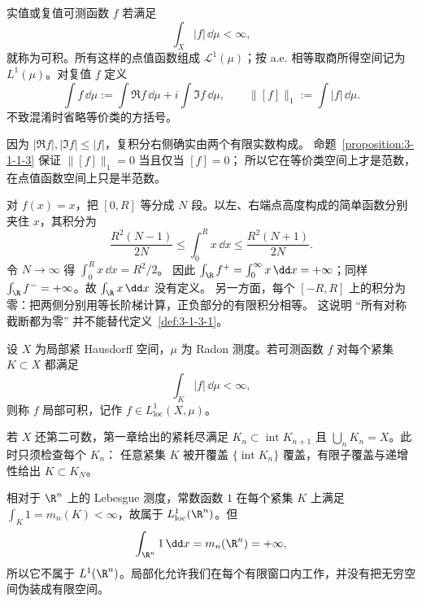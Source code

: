 \begin{definition}[$L^1$ 可积]\label{def:3-1-3-2}
实值或复值可测函数 $f$ 若满足
\[
 \int_X|f|\,\dd\mu<\infty,
\]
就称为可积。所有这样的点值函数组成 $\mathcal L^1(\mu)$；按 a.e. 相等取商所得空间记为
$L^1(\mu)$。对复值 $f$ 定义
\[
 \int f\,\dd\mu:=\int\Re f\,\dd\mu+i\int\Im f\,\dd\mu,
 \qquad
 \|[f]\|_1:=\int|f|\,\dd\mu.
 \tag{3.1.16}\label{eq:3-1-complex-integral}
\]
不致混淆时省略等价类的方括号。
\end{definition}

因为 $|\Re f|,|\Im f|\leq|f|$，复积分右侧确实由两个有限实数构成。
命题~\ref{proposition:3-1-1-3} 保证 $\|[f]\|_1=0$ 当且仅当 $[f]=0$；
所以它在等价类空间上才是范数，在点值函数空间上只是半范数。

\begin{example}[条件抵消不可定义]\label{ex:3-1-3-1}
对 $f(x)=x$，把 $[0,R]$ 等分成 $N$ 段。以左、右端点高度构成的简单函数分别夹住 $x$，其积分为
\[
 \frac{R^2(N-1)}{2N}
 \leq\int_0^R x\,\dd x
 \leq\frac{R^2(N+1)}{2N}.
\]
令 $N\to\infty$ 得 $\int_0^Rx\,\dd x=R^2/2$。
因此 $\int_\R f^+=\int_0^\infty x\,\dd x=+\infty$；同样
$\int_\R f^-=+\infty$。故 $\int_\R x\,\dd x$ 没有定义。
另一方面，每个 $[-R,R]$ 上的积分为零：把两侧分别用等长阶梯计算，正负部分的有限积分相等。
这说明 ``所有对称截断都为零'' 并不能替代定义~\ref{def:3-1-3-1}。
\end{example}

\begin{definition}[局部可积]\label{def:3-1-3-3}
设 $X$ 为局部紧 Hausdorff 空间，$\mu$ 为 Radon 测度。若可测函数 $f$ 对每个紧集
$K\subset X$ 都满足
\[
 \int_K|f|\,\dd\mu<\infty,
\]
则称 $f$ 局部可积，记作 $f\in L^1_{\mathrm{loc}}(X,\mu)$。
\end{definition}

若 $X$ 还第二可数，第一章给出的紧耗尽满足
$K_n\subset\operatorname{int}K_{n+1}$ 且 $\bigcup_nK_n=X$。此时只须检查每个 $K_n$：
任意紧集 $K$ 被开覆盖 $\{\operatorname{int}K_n\}$ 覆盖，有限子覆盖与递增性给出
$K\subset K_N$。

\begin{example}[局部可积但不可积]\label{ex:3-1-3-2}
相对于 $\R^n$ 上的 Lebesgue 测度，常数函数 $1$ 在每个紧集 $K$ 上满足
$\int_K1=m_n(K)<\infty$，故属于 $L^1_{\mathrm{loc}}(\R^n)$。但
\[
 \int_{\R^n}1\,\dd x=m_n(\R^n)=+\infty,
\]
所以它不属于 $L^1(\R^n)$。局部化允许我们在每个有限窗口内工作，并没有把无穷空间伪装成有限空间。
\end{example}


